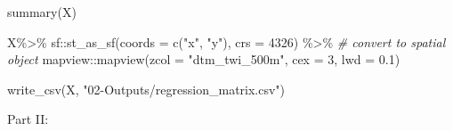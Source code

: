 \documentclass[
  10pt,
  b5paper,
  oneside]{book}
\newenvironment{Shaded}{\begin{snugshade}}{\end{snugshade}}
\newcommand{\AttributeTok}[1]{\textcolor[rgb]{0.77,0.63,0.00}{#1}}
\newcommand{\CommentTok}[1]{\textcolor[rgb]{0.56,0.35,0.01}{\textit{#1}}}
\newcommand{\DecValTok}[1]{\textcolor[rgb]{0.00,0.00,0.81}{#1}}
\newcommand{\FloatTok}[1]{\textcolor[rgb]{0.00,0.00,0.81}{#1}}
\newcommand{\FunctionTok}[1]{\textcolor[rgb]{0.00,0.00,0.00}{#1}}
\newcommand{\NormalTok}[1]{#1}
\newcommand{\SpecialCharTok}[1]{\textcolor[rgb]{0.00,0.00,0.00}{#1}}
\newcommand{\StringTok}[1]{\textcolor[rgb]{0.31,0.60,0.02}{#1}}
\begin{document}
\begin{Shaded}
\begin{Highlighting}[]
\FunctionTok{summary}\NormalTok{(X)}

\NormalTok{X}\SpecialCharTok{\%\textgreater{}\%}
\NormalTok{  sf}\SpecialCharTok{::}\FunctionTok{st\_as\_sf}\NormalTok{(}\AttributeTok{coords =} \FunctionTok{c}\NormalTok{(}\StringTok{"x"}\NormalTok{, }\StringTok{"y"}\NormalTok{), }\AttributeTok{crs =} \DecValTok{4326}\NormalTok{) }\SpecialCharTok{\%\textgreater{}\%} 
  \CommentTok{\# convert to spatial object}
\NormalTok{  mapview}\SpecialCharTok{::}\FunctionTok{mapview}\NormalTok{(}\AttributeTok{zcol =} \StringTok{"dtm\_twi\_500m"}\NormalTok{, }\AttributeTok{cex =} \DecValTok{3}\NormalTok{, }\AttributeTok{lwd =} \FloatTok{0.1}\NormalTok{)}

\FunctionTok{write\_csv}\NormalTok{(X, }\StringTok{"02{-}Outputs/regression\_matrix.csv"}\NormalTok{)}
\end{Highlighting}
\end{Shaded}

Part II:
\end{document}
